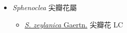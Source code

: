
  \begin{itemize}
 \item[] \textit{Sphenoclea} 尖瓣花屬
                    
  \begin{itemize}
        \item[] \href{http://www.theplantlist.org/tpl1.1/search?q=Sphenoclea+zeylanica}{\textit{S. zeylanica} Gaertn.}   尖瓣花 LC
  \end{itemize}
  \end{itemize}
